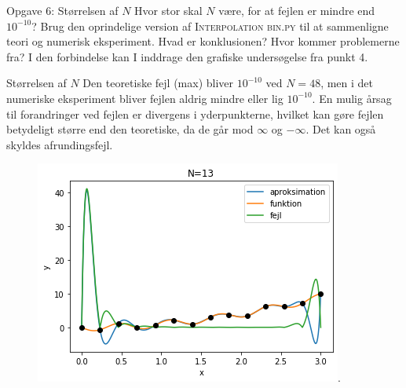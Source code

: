 \begin{frame}{Opgave 6: Størrelsen af $N$}
    Hvor stor skal $N$ være, for at fejlen er mindre end $10^{-10}$? 
    Brug den oprindelige version af \textsc{Interpolation bin.py} til at sammenligne teori og numerisk eksperiment. 
    Hvad er konklusionen? 
    Hvor kommer problemerne fra? 
    I den forbindelse kan I inddrage den grafiske undersøgelse fra punkt 4.
\end{frame}

\begin{frame}{Størrelsen af $N$}
    Den teoretiske fejl (max) bliver $10^{-10}$ ved $N=48$, men i det numeriske eksperiment bliver fejlen aldrig mindre eller lig $10^{-10}$. 
    En mulig årsag til forandringer ved fejlen er divergens i yderpunkterne, hvilket kan gøre fejlen betydeligt større end den teoretiske, da de går mod $ \infty $ og $ - \infty $. Det kan også skyldes afrundingsfejl. 
    \begin{figure}
        \centering
            \includegraphics[scale=0.45]{Images/N=13.png}.
    \end{figure}
\end{frame}
